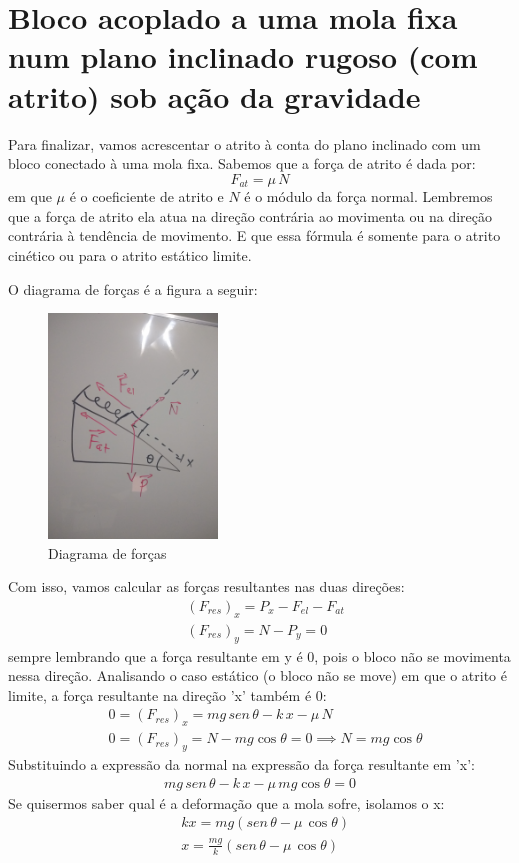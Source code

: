 \documentclass[12pt]{extarticle}
\newcommand{\<}{\langle}
\renewcommand{\>}{\rangle}
\theoremstyle{definition}
\begin{document}
\section{Bloco acoplado a uma mola fixa num plano inclinado rugoso (com  atrito) sob ação da gravidade}

Para finalizar, vamos acrescentar o atrito à conta do plano inclinado com um bloco conectado à uma mola fixa. Sabemos que a força de atrito é dada por:
\begin{equation*}
    F_{at} = \mu\,N
\end{equation*}
\noindent em que $\mu$ é o coeficiente de atrito e $N$ é o módulo da força normal. Lembremos que a força de atrito ela atua na direção contrária ao movimenta ou na direção contrária à tendência de movimento. E que essa fórmula é somente para o atrito cinético ou para o atrito estático limite.

O diagrama de forças é a figura a seguir:
\begin{figure}[H]
    \centering
    \includegraphics[width=0.4\textwidth]{plano_inclinado_mola_atrito.jpg}
    \caption{Diagrama de forças}
    \label{fig:mola_atrito}
\end{figure}

Com isso, vamos calcular as forças resultantes nas duas direções:
\begin{align*}
    &(F_{res})_{x} = P_x - F_{el} - F_{at} \\
    &(F_{res})_{y} = N - P_y =0
\end{align*}
\noindent sempre lembrando que a força resultante em y é 0, pois o bloco não se movimenta nessa direção. Analisando o caso estático (o bloco não se move) em que o atrito é limite, a força resultante na direção 'x' também é 0:
\begin{align*}
    &0=(F_{res})_{x} = mg\,sen\,\theta - k\,x - \mu\,N \\
    &0=(F_{res})_{y} = N -mg\cos\theta =0 \implies \boxed{N = mg\cos\theta}
\end{align*}
Substituindo a expressão da normal na expressão da força resultante em 'x':
\begin{align*}
    mg\,sen\,\theta - k\,x - \mu\, mg\cos\theta =0
\end{align*}
Se quisermos saber qual é a deformação que a mola sofre, isolamos o x:
\begin{align*}
    &kx = mg(sen\,\theta - \mu\,\cos\theta)\\
    &\boxed{x = \frac{mg}{k} \left(sen\,\theta - \mu\,\cos\theta\right)}
\end{align*}
\end{document}
